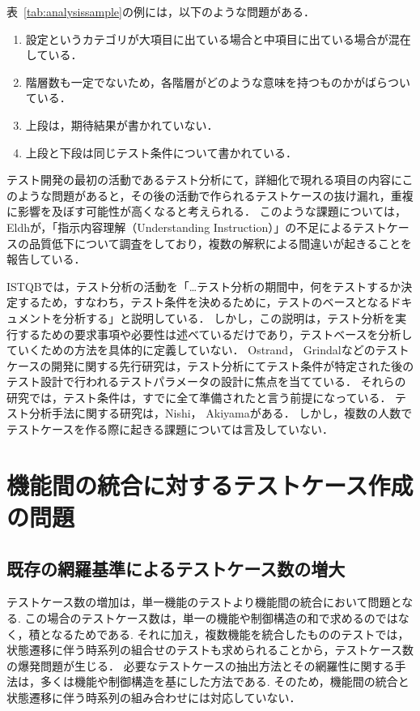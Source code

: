 表~\ref{tab:analysissample}の例には，以下のような問題がある．
\begin{enumerate}
\item 設定というカテゴリが大項目に出ている場合と中項目に出ている場合が混在している．
\item 階層数も一定でないため，各階層がどのような意味を持つものかがばらついている．
\item 上段は，期待結果が書かれていない．
\item 上段と下段は同じテスト条件について書かれている．
\end{enumerate}
テスト開発の最初の活動であるテスト分析にて，詳細化で現れる項目の内容にこのような問題があると，その後の活動で作られるテストケースの抜け漏れ，重複に影響を及ぼす可能性が高くなると考えられる．
このような課題については，Eldhが，「指示内容理解（Understanding Instruction）」の不足によるテストケースの品質低下について調査をしており，複数の解釈による間違いが起きることを報告している\cite{eldh2011analysis}．

ISTQBでは，テスト分析の活動を「…テスト分析の期間中，何をテストするか決定するため，すなわち，テスト条件を決めるために，テストのベースとなるドキュメントを分析する」と説明している．
しかし，この説明は，テスト分析を実行するための要求事項や必要性は述べているだけであり，テストベースを分析していくための方法を具体的に定義していない．
Ostrand\cite{Ostrand:1988:CMS:62959.62964}， Grindal\cite{Grindal:2007:IPM:1332044.1332085}などのテストケースの開発に関する先行研究は，テスト分析にてテスト条件が特定された後のテスト設計で行われるテストパラメータの設計に焦点を当てている．
それらの研究では，テスト条件は，すでに全て準備されたと言う前提になっている．
テスト分析手法に関する研究は，Nishi\cite{nishi2012based}， Akiyama\cite{Akiyama2014}がある．
しかし，複数の人数でテストケースを作る際に起きる課題については言及していない．

\newpage
\section{機能間の統合に対するテストケース作成の問題} \label{sec:2-3}
\subsection{既存の網羅基準によるテストケース数の増大}
テストケース数の増加は，単一機能のテストより機能間の統合において問題となる.
この場合のテストケース数は，単一の機能や制御構造の和で求めるのではなく，積となるためである.
それに加え，複数機能を統合したもののテストでは，状態遷移に伴う時系列の組合せのテストも求められることから，テストケース数の爆発問題が生じる．
必要なテストケースの抽出方法とその網羅性に関する手法は，多くは機能や制御構造を基にした方法である.
そのため，機能間の統合と状態遷移に伴う時系列の組み合わせには対応していない．

